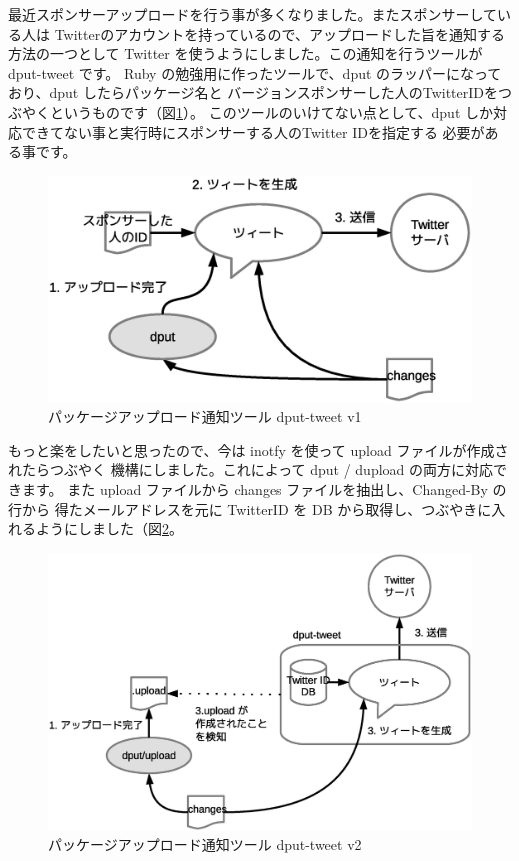 \documentclass[mingoth,a4paper]{jsarticle}
\begin{document}
最近スポンサーアップロードを行う事が多くなりました。またスポンサーしている人は
Twitterのアカウントを持っているので、アップロードした旨を通知する方法の一つとして
Twitter を使うようにしました。この通知を行うツールが dput-tweet です。
Ruby の勉強用に作ったツールで、dput のラッパーになっており、dput したらパッケージ名と
バージョンスポンサーした人のTwitterIDをつぶやくというものです（図\ref{fig:dput-tweet-v1}）。
このツールのいけてない点として、dput しか対応できてない事と実行時にスポンサーする人のTwitter IDを指定する
必要がある事です。


\begin{figure}[h]
\begin{center}
\includegraphics[width=0.7\hsize]{image201201/debianmeeting201201-imagedata-v1.eps}
\caption{パッケージアップロード通知ツール dput-tweet v1}
\label{fig:dput-tweet-v1}
\end{center}
\end{figure}

もっと楽をしたいと思ったので、今は inotfy を使って upload ファイルが作成されたらつぶやく
機構にしました。これによって dput / dupload の両方に対応できます。
また upload ファイルから changes ファイルを抽出し、Changed-By の行から 得たメールアドレスを元に
TwitterID を DB から取得し、つぶやきに入れるようにしました（図\ref{fig:dput-tweet-v2}。

\begin{figure}[h]
\begin{center}
\includegraphics[width=0.7\hsize]{image201201/debianmeeting201201-imagedata-v2.eps}
\caption{パッケージアップロード通知ツール dput-tweet v2}
\label{fig:dput-tweet-v2}
\end{center}
\end{figure}
\end{document}
